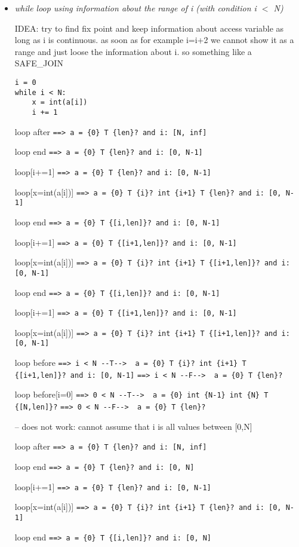 \documentclass[11pt]{article}
\begin{document}
\begin{itemize}
\item \textit{while loop using information about the range of i (with condition i $<$ N)}

IDEA: try to find fix point and keep information about access variable as long as i is continuous. as soon as for example i=i+2 we cannot show it as a range and just loose the information about i. so something like a SAFE\_JOIN

\begin{lstlisting}[numbers=none]
i = 0
while i < N:
    x = int(a[i])
    i += 1
\end{lstlisting}

loop after \verb|==> a = {0} T {len}? and i: [N, inf]|

loop end \verb|==> a = {0} T {len}? and i: [0, N-1]|

loop[i+=1] \verb|==> a = {0} T {len}? and i: [0, N-1]|

loop[x=int(a[i])] \verb|==> a = {0} T {i}? int {i+1} T {len}? and i: [0, N-1]|

loop end \verb|==> a = {0} T {[i,len]}? and i: [0, N-1]|

loop[i+=1] \verb|==> a = {0} T {[i+1,len]}? and i: [0, N-1]|

loop[x=int(a[i])] \verb|==> a = {0} T {i}? int {i+1} T {[i+1,len]}? and i: [0, N-1]|

loop end \verb|==> a = {0} T {[i,len]}? and i: [0, N-1]|

loop[i+=1] \verb|==> a = {0} T {[i+1,len]}? and i: [0, N-1]|

loop[x=int(a[i])] \verb|==> a = {0} T {i}? int {i+1} T {[i+1,len]}? and i: [0, N-1]|

loop before \verb|==> i < N --T-->  a = {0} T {i}? int {i+1} T {[i+1,len]}? and i: [0, N-1]| \verb|==> i < N --F-->  a = {0} T {len}?|

loop before[i=0] \verb|==> 0 < N --T-->  a = {0} int {N-1} int {N} T {[N,len]}?| \verb|==> 0 < N --F-->  a = {0} T {len}?|

-- does not work: cannot assume that i is all values between [0,N]

loop after \verb|==> a = {0} T {len}? and i: [N, inf]|

loop end \verb|==> a = {0} T {len}? and i: [0, N]|

loop[i+=1] \verb|==> a = {0} T {len}? and i: [0, N-1]|

loop[x=int(a[i])] \verb|==> a = {0} T {i}? int {i+1} T {len}? and i: [0, N-1]|

loop end \verb|==> a = {0} T {[i,len]}? and i: [0, N]|


\end{itemize}
\end{document}
